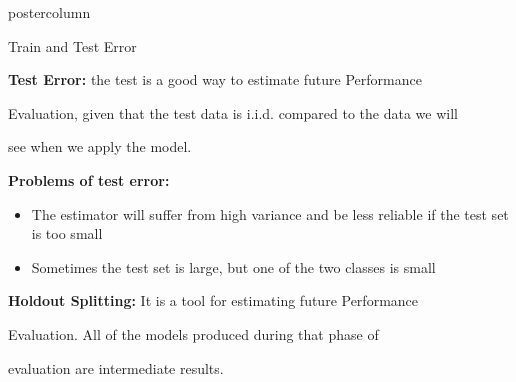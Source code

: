 \documentclass{beamer}
\begin{document}
\begin{frame}[fragile]{}
\begin{columns}
\begin{column}{.31\textwidth}
\begin{beamercolorbox}[center]{postercolumn}
\begin{minipage}{.98\textwidth}
{\begin{myblock}{Train and Test Error}
    \vspace*{1ex}
    
    \begin{codebox}
    \textbf{Test Error: }the test is a good way to estimate future Performance
    \end{codebox}
    
    \begin{codebox}
     Evaluation, given that the test data is i.i.d. compared to the data we will 
    \end{codebox}
   
    \begin{codebox}
    see when we apply the model.
    \end{codebox}
    
    \hspace*{1ex}\textbf{Problems of test error:}
    
    \begin{itemize}[$\bullet$]
    \setlength{\itemindent}{+.3in}
    \item The estimator will suffer from high variance and be less reliable if the test set is too small
    \item Sometimes the test set is large, but one of the two classes is small
    \end{itemize}
    
    \vspace*{1ex}
    
    \begin{codebox}
    \textbf{Holdout Splitting: }It is a tool for estimating future Performance 
    \end{codebox}
    
    \begin{codebox}
     Evaluation. All of the models produced during that phase of  
    \end{codebox}
    
    \begin{codebox}
     evaluation are intermediate results.
    \end{codebox}
    

\end{myblock}}
\end{minipage}
\end{beamercolorbox}
\end{column}
\end{columns}
\end{frame}
\end{document}
